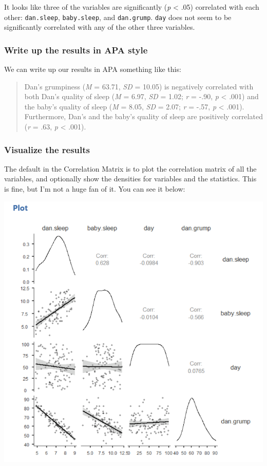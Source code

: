 \documentclass[
]{book}
\begin{document}
It looks like three of the variables are significantly (\emph{p} \textless{} .05) correlated with each other: \texttt{dan.sleep}, \texttt{baby.sleep}, and \texttt{dan.grump}. \texttt{day} does not seem to be significantly correlated with any of the other three variables.

\hypertarget{write-up-the-results-in-apa-style-8}{%
\subsubsection{Write up the results in APA style}\label{write-up-the-results-in-apa-style-8}}

We can write up our results in APA something like this:

\begin{quote}
Dan's grumpiness (\emph{M} = 63.71, \emph{SD} = 10.05) is negatively correlated with both Dan's quality of sleep (\emph{M} = 6.97, \emph{SD} = 1.02; \emph{r} = -.90, \emph{p} \textless{} .001) and the baby's quality of sleep (\emph{M} = 8.05, \emph{SD} = 2.07; \emph{r} = -.57, \emph{p} \textless{} .001). Furthermore, Dan's and the baby's quality of sleep are positively correlated (\emph{r} = .63, \emph{p} \textless{} .001).
\end{quote}

\hypertarget{visualize-the-results-7}{%
\subsubsection{Visualize the results}\label{visualize-the-results-7}}

The default in the Correlation Matrix is to plot the correlation matrix of all the variables, and optionally show the densities for variables and the statistics. This is fine, but I'm not a huge fan of it. You can see it below:

\includegraphics{images/08-correlation/correlation-plots.png}
\end{document}

